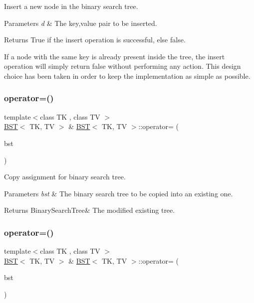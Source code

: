 Insert a new node in the binary search tree. 


\begin{DoxyParams}{Parameters}
{\em d} & The key,value pair to be inserted. \\
\hline
\end{DoxyParams}
\begin{DoxyReturn}{Returns}
True if the insert operation is successful, else false.
\end{DoxyReturn}
If a node with the same key is already present inside the tree, the insert operation will simply return false without performing any action. This design choice has been taken in order to keep the implementation as simple as possible. \mbox{\label{classBST_ad5b24356902b7c8bbf265d1f6f683c81}} 
\subsubsection{\texorpdfstring{operator=()}{operator=()}\hspace{0.1cm}{\footnotesize\ttfamily [1/2]}}
{\footnotesize\ttfamily template$<$class TK , class TV $>$ \\
\hyperlink{classBST}{B\+ST}$<$ TK, TV $>$ \& \hyperlink{classBST}{B\+ST}$<$ TK, TV $>$\+::operator= (\begin{DoxyParamCaption}\item[{const \hyperlink{classBST}{B\+ST}$<$ TK, TV $>$ \&}]{bst }\end{DoxyParamCaption})}



Copy assignment for binary search tree. 


\begin{DoxyParams}{Parameters}
{\em bst} & The binary search tree to be copied into an existing one. \\
\hline
\end{DoxyParams}
\begin{DoxyReturn}{Returns}
Binary\+Search\+Tree\& The modified existing tree. 
\end{DoxyReturn}
\mbox{\label{classBST_ae2d6d6425760adec3ed7ee01244a2ca7}} 
\subsubsection{\texorpdfstring{operator=()}{operator=()}\hspace{0.1cm}{\footnotesize\ttfamily [2/2]}}
{\footnotesize\ttfamily template$<$class TK , class TV $>$ \\
\hyperlink{classBST}{B\+ST}$<$ TK, TV $>$ \& \hyperlink{classBST}{B\+ST}$<$ TK, TV $>$\+::operator= (\begin{DoxyParamCaption}\item[{\hyperlink{classBST}{B\+ST}$<$ TK, TV $>$ \&\&}]{bst }\end{DoxyParamCaption})}



